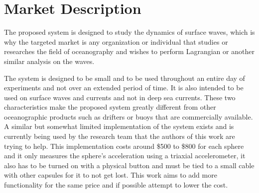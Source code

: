 \section{Market Description}
The proposed system is designed to study the dynamics of surface waves, which is why the targeted market is any organization or individual that studies or researches the field of oceanography and wishes to perform Lagrangian or another similar analysis on the waves. 

The system is designed to be small and to be used throughout an entire day of experiments and not over an extended period of time. It is also intended to be used on surface waves and currents and not in deep sea currents.  These two characteristics make the proposed system greatly different from other oceanographic products such as drifters or buoys that are commercially available. A similar but somewhat limited implementation of the system exists and is currently being used by the research team that the authors of this work are trying to help.  This implementation costs around \$500 to \$800 for each sphere and it only measures the sphere's acceleration using a triaxial accelerometer, it also has to be turned on with a physical button and must be tied to a small cable with other capsules for it to not get lost. This work aims to add more functionality for the same price and if possible attempt to lower the cost.

